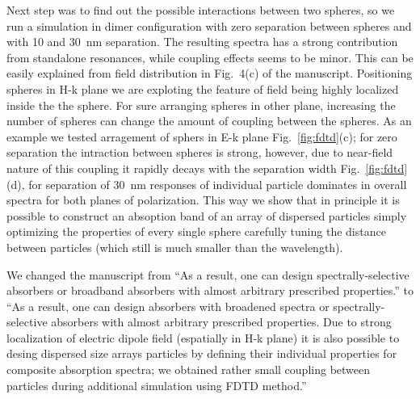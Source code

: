 \documentclass[a4paper]{article}
\begin{document}
Next step was to find out the possible interactions between two
spheres, so we run a simulation in dimer configuration with zero
separation between spheres and with 10 and 30~nm separation.  The
resulting spectra has a strong contribution from standalone
resonances, while coupling effects seems to be minor.  This can be
easily explained from field distribution in Fig.~4(c) of the
manuscript. Positioning spheres in H-k plane we are exploting the
feature of field being highly localized inside the the sphere.  For
sure arranging spheres in other plane, increasing the number of
spheres can change the amount of coupling between the spheres. As an
example we tested arragement of sphers in E-k plane
Fig.~\ref{fig:fdtd}(c); for zero separation the intraction between
spheres is strong, however, due to near-field nature of this coupling
it rapidly decays with the separation width Fig.~\ref{fig:fdtd}(d),
for separation of 30~nm responses of individual particle dominates in
overall spectra for both planes of polarization. This way we show that
in principle it is possible to construct an absoption band of an array
of dispersed particles simply optimizing the properties of every
single sphere carefully tuning the distance between particles (which
still is much smaller than the wavelength).

We changed the manuscript from ``As a result, one can design
spectrally-selective absorbers or broadband absorbers with almost
arbitrary prescribed properties.'' to ``As a result, one can design
absorbers with broadened spectra or spectrally-selective absorbers
with almost arbitrary prescribed properties.  Due to strong
localization of electric dipole field (espatially in H-k plane) it is
also possible to desing dispersed size arrays particles by defining
their individual properties for composite absorption spectra; we
obtained rather small coupling between particles during additional
simulation using FDTD method.''


\end{document}
